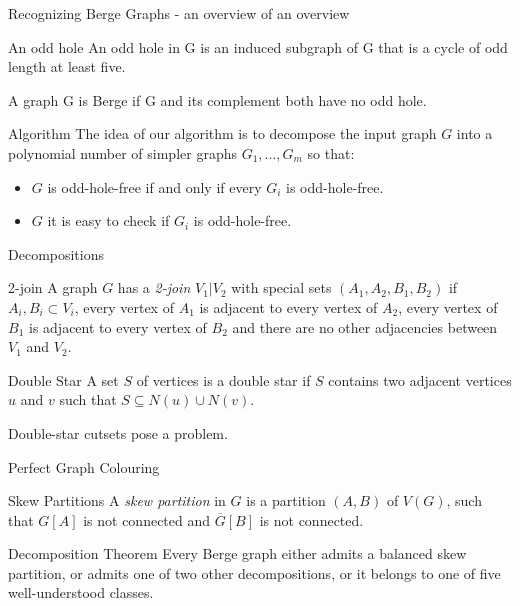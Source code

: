\documentclass{beamer}
\begin{document}
\begin{frame}{Recognizing Berge Graphs - an overview of an overview}
\begin{block}{An odd hole}
An odd hole in G is an induced subgraph of G that is a cycle of odd length at least five.
\end{block}
A graph G is Berge if G and its complement both have no odd hole.

\begin{block}{Algorithm}
The idea of our algorithm is to decompose the input graph $G$ into a polynomial number of simpler graphs
$G_1, ..., G_m$ so that:
\begin{itemize}
\item $G$ is odd-hole-free if and only if every $G_i$ is odd-hole-free.
\item $G$ it is easy to check if $G_i$ is odd-hole-free.
\end{itemize}
\end{block}

\end{frame}

\begin{frame}{Decompositions}

\begin{block}{2-join}
A graph $G$ has a \emph{2-join} $V_1|V_2$ with special sets $(A_1, A_2, B_1, B_2)$ if $A_i, B_i \subset V_i$, every vertex of $A_1$ is adjacent to every vertex of $A_2$, every vertex of $B_1$ is adjacent to every vertex of $B_2$ and there are no other adjacencies between $V_1$ and $V_2$.
\end{block}

\begin{block}{Double Star}
A set $S$ of vertices is a double star if $S$ contains two adjacent vertices $u$ and $v$ such that
$S \subseteq N(u) \cup N(v)$.
\end{block}
Double-star cutsets pose a problem.

\end{frame}


\begin{frame}{Perfect Graph Colouring}
\begin{block}{Skew Partitions}
A \emph{skew partition} in $G$ is a partition $(A, B)$ of $V(G)$, such that $G[A]$ is not connected and $\overline{G}[B]$ is not connected.
\end{block}

\begin{block}{Decomposition Theorem}
Every Berge graph either admits a balanced skew partition, or admits one of two other decompositions, or it belongs to one of five well-understood classes.
\end{block}

\end{frame}
\end{document}
